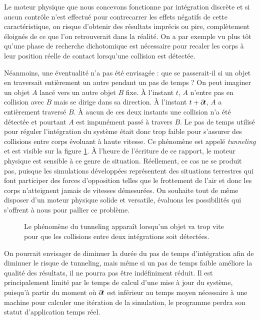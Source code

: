 Le moteur physique que nous concevons fonctionne par intégration
discrète et si aucun contrôle n'est effectué pour contrecarrer les
effets négatifs de cette caractéristique, on risque d'obtenir des
résultats imprécis ou pire, complètement éloignés de ce que l'on
retrouverait dans la réalité. On a par exemple vu plus tôt qu'une
phase de recherche dichotomique est nécessaire pour recaler les corps
à leur position réelle de contact lorsqu'une collision est détectée.

Néanmoins, une éventualité n'a pas été envisagée : que se passerait-il
si un objet en traversait entièrement un autre pendant un pas de temps
? On peut imaginer un objet $A$ lancé vers un autre objet $B$
fixe. \`A l'instant $t$, $A$ n'entre pas en collision avec $B$ mais se
dirige dans sa direction. \`A l'instant $t + \partial \! t$, $A$ a
entièrement traversé $B$. \`A aucun de ces deux instants une collision
n'a été détectée et pourtant $A$ est impunément passé à travers
$B$. Le pas de temps utilisé pour réguler l'intégration du système
était donc trop faible pour s'assurer des collisions entre corps
évoluant à haute vitesse. Ce phénomène est appelé \textit{tunneling}
et est visible sur la figure \ref{tunneling1}. \`A l'heure de
l'écriture de ce rapport, le moteur physique est sensible à ce genre
de situation. Réellement, ce cas ne se produit pas, puisque les
simulations développées représentent des situations terrestres qui
font participer des forces d'opposition telles que le frottement de
l'air et donc les corps n'atteignent jamais de vitesses démesurées. On
souhaite tout de même disposer d'un moteur physique solide et
versatile, évaluons les possibilités qui s'offrent à nous pour pallier
ce problème.

\begin{figure}
  \centering
  
  \caption{Le phénomène du tunneling apparaît lorsqu'un objet va trop
    vite pour que les collisions entre deux intégrations soit détectées.}
  \label{tunneling1}
\end{figure}

On pourrait envisager de diminuer la durée du pas de temps
d'intégration afin de diminuer le risque de tunneling, mais même si un
pas de temps faible améliore la qualité des résultats, il ne pourra
pas être indéfiniment réduit. Il est principalement limité par le
temps de calcul d'une mise à jour du système, puisqu'à partir du
moment o\`u $\partial \! t$ est inférieur au temps moyen nécessaire à une
machine pour calculer une itération de la simulation, le programme
perdra son statut d'application temps réel.

